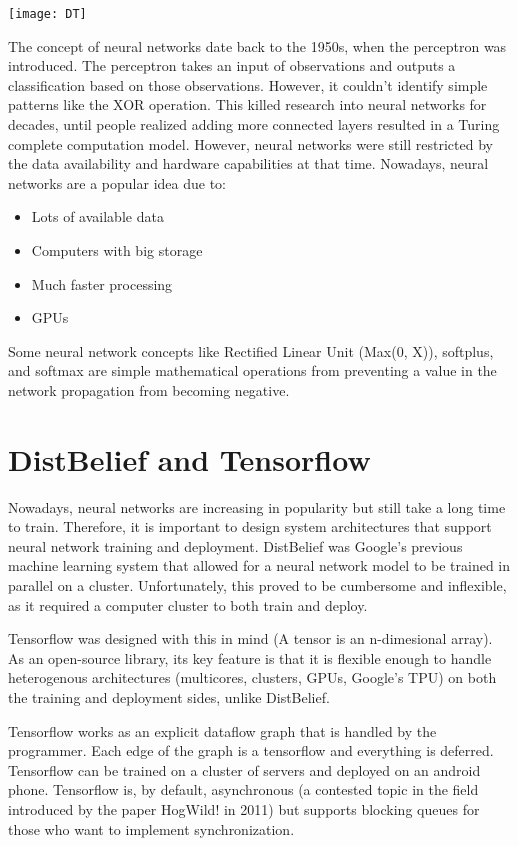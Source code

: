 \documentclass[twoside]{article}
\begin{document}
\begin{center}
    \texttt{[image: DT]}
\end{center}

The concept of neural networks date back to the 1950s, when the perceptron was introduced. The perceptron takes an input of observations and outputs a classification based on those observations. However, it couldn't identify simple patterns like the XOR operation. This killed research into neural networks for decades, until people realized adding more connected layers resulted in a Turing complete computation model. However, neural networks were still restricted by the data availability and hardware capabilities at that time. Nowadays, neural networks are a popular idea due to:

\begin{itemize}
    \item Lots of available data
    \item Computers with big storage
    \item Much faster processing
    \item GPUs
\end{itemize}

Some neural network concepts like Rectified Linear Unit (Max(0, X)), softplus, and softmax are simple mathematical operations from preventing a value in the network propagation from becoming negative. 

\section{DistBelief and Tensorflow}

Nowadays, neural networks are increasing in popularity but still take a long time to train. Therefore, it is important to design system architectures that support neural network training and deployment. DistBelief was Google's previous machine learning system that allowed for a neural network model to be trained in parallel on a cluster. Unfortunately, this proved to be cumbersome and inflexible, as it required a computer cluster to both train and deploy.

Tensorflow was designed with this in mind (A tensor is an n-dimesional array). As an open-source library, its key feature is that it is flexible enough to handle heterogenous architectures (multicores, clusters, GPUs, Google's TPU) on both the training and deployment sides, unlike DistBelief.

Tensorflow works as an explicit dataflow graph that is handled by the programmer. Each edge of the graph is a tensorflow and everything is deferred. Tensorflow can be trained on a cluster of servers and deployed on an android phone. Tensorflow is, by default, asynchronous (a contested topic in the field introduced by the paper HogWild! in 2011) but supports blocking queues for those who want to implement synchronization. 
\end{document}
